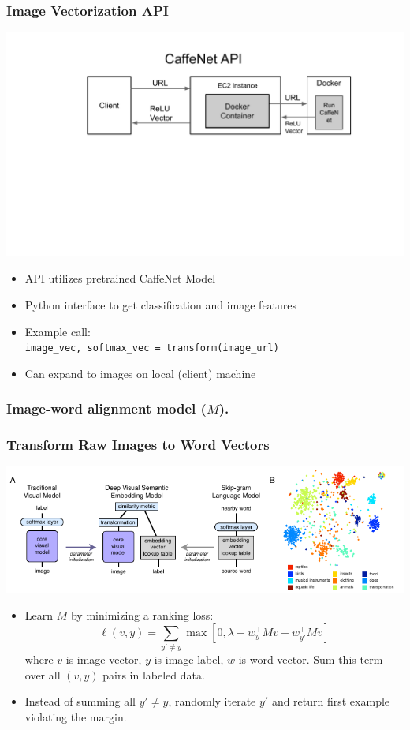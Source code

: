 \documentclass{beamer}
\begin{document}
\begin{frame}
  \frametitle{Image Vectorization API}
  \begin{center}
    \includegraphics[width=\textwidth]{assets/CaffeNetAPI.pdf}
  \end{center}
  \begin{itemize}
    \item API utilizes pretrained CaffeNet Model 
    \item Python interface to get classification and image features 
    \item Example call: \\ \texttt{image\_vec, softmax\_vec = transform(image\_url)}
    \item Can expand to images on local (client) machine
  \end{itemize}
\end{frame}

\begin{frame}
  \frametitle{Image-word alignment model ($M$).}
\end{frame}

\begin{frame}
  \frametitle{Transform Raw Images to Word Vectors}
  \begin{center}
    \includegraphics[width=\textwidth]{assets/devise.pdf}
  \end{center}
  \begin{itemize}
    \item Learn $M$ by minimizing a ranking loss: $$\ell(v, y) = \sum_{y' \neq y} \max \left[0, \lambda - w_{y}^\top M v + w_{y'} ^\top M v \right]$$ where $v$ is image vector, $y$ is image label, $w$ is word vector. Sum this term over all $(v, y)$ pairs in labeled data.
    \item Instead of summing all $y' \neq y$, randomly iterate $y'$ and return first example violating the margin.
  \end{itemize}
\end{frame}
\end{document}

